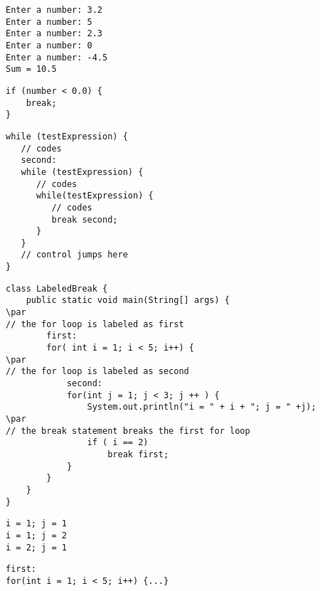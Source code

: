 \documentclass{book}
\def\lthtmlcheckvsize{\ifdim\ht\sizebox<\vsize 
  \ifdim\wd\sizebox<\hsize\expandafter\hfill\fi \expandafter\vfill
  \else\expandafter\vss\fi}%
\begin{document}
{\newpage\clearpage
{}%
\begin{lstlisting}
Enter a number: 3.2
Enter a number: 5
Enter a number: 2.3
Enter a number: 0
Enter a number: -4.5
Sum = 10.5
\end{lstlisting}%
\lthtmlfigureZ
\lthtmlcheckvsize\clearpage}

{\newpage\clearpage
{}%
\begin{lstlisting}
if (number < 0.0) {
    break;
}
\end{lstlisting}%
\lthtmlfigureZ
\lthtmlcheckvsize\clearpage}

{\newpage\clearpage
{}%
\begin{lstlisting}
while (testExpression) {
   // codes
   second:
   while (testExpression) {
      // codes
      while(testExpression) {
         // codes
         break second;
      }
   }
   // control jumps here
}
\end{lstlisting}%
\lthtmlfigureZ
\lthtmlcheckvsize\clearpage}

{\newpage\clearpage
{}%
\begin{lstlisting}
class LabeledBreak {
    public static void main(String[] args) {
\par
// the for loop is labeled as first   
        first:
        for( int i = 1; i < 5; i++) {
\par
// the for loop is labeled as second
            second:
            for(int j = 1; j < 3; j ++ ) {
                System.out.println("i = " + i + "; j = " +j);
\par
// the break statement breaks the first for loop
                if ( i == 2)
                    break first;
            }
        }
    }
}
\end{lstlisting}%
\lthtmlfigureZ
\lthtmlcheckvsize\clearpage}

{\newpage\clearpage
{}%
\begin{lstlisting}
i = 1; j = 1
i = 1; j = 2
i = 2; j = 1
\end{lstlisting}%
\lthtmlfigureZ
\lthtmlcheckvsize\clearpage}

{\newpage\clearpage
{}%
\begin{lstlisting}
first:
for(int i = 1; i < 5; i++) {...}
\end{lstlisting}%
\lthtmlfigureZ
\lthtmlcheckvsize\clearpage}
\end{document}
